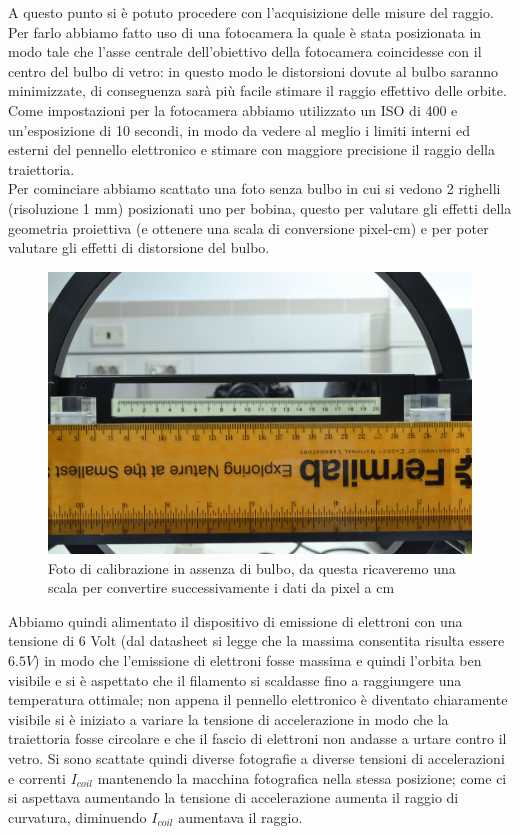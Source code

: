 \documentclass[10pt, a4paper, italian]{article}
\begin{document}
A questo punto si è potuto procedere con l'acquisizione delle misure del raggio.
Per farlo abbiamo fatto uso di una fotocamera la quale è stata posizionata in modo tale che l'asse centrale dell'obiettivo della fotocamera coincidesse con il centro del bulbo di vetro: in questo modo le distorsioni dovute al bulbo saranno minimizzate, di conseguenza sarà più facile stimare il raggio effettivo delle orbite.
Come impostazioni per la fotocamera abbiamo utilizzato un ISO di 400 e un'esposizione di 10 secondi, in modo da vedere al meglio i limiti interni ed esterni del pennello elettronico e stimare con maggiore precisione il raggio della traiettoria.\\
Per cominciare abbiamo scattato una foto senza bulbo in cui si vedono 2 righelli (risoluzione 1 mm) posizionati uno per bobina, questo per valutare gli effetti della geometria proiettiva (e ottenere una scala di conversione pixel-cm) e per poter valutare gli effetti di distorsione del bulbo.
\begin{figure}
\includegraphics[width=\textwidth]{cal1}
\caption{Foto di calibrazione in assenza di bulbo, da questa ricaveremo una scala per convertire successivamente i dati da pixel a cm}
\end{figure}
Abbiamo quindi alimentato il dispositivo di emissione di elettroni con una tensione di 6 Volt (dal datasheet si legge che la massima consentita risulta essere $6.5 V$) in modo che l'emissione di elettroni fosse massima  e quindi l'orbita ben visibile e si è aspettato che il filamento si scaldasse fino a raggiungere una temperatura ottimale; non appena il pennello elettronico è diventato chiaramente visibile si è iniziato a variare la tensione di accelerazione in modo che la traiettoria fosse circolare e che il fascio di elettroni non andasse a urtare contro il vetro.
Si sono scattate quindi diverse fotografie a diverse tensioni di accelerazioni e correnti $I_{coil}$ mantenendo la macchina fotografica nella stessa posizione; come ci si aspettava aumentando la tensione di accelerazione aumenta il raggio di curvatura, diminuendo $I_{coil}$ aumentava il raggio.
\end{document}
